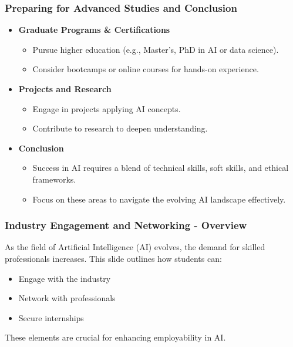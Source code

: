 \documentclass{beamer}
\begin{document}
\begin{frame}[fragile]
    \frametitle{Preparing for Advanced Studies and Conclusion}
    \begin{itemize}
        \item \textbf{Graduate Programs \& Certifications}
        \begin{itemize}
            \item Pursue higher education (e.g., Master's, PhD in AI or data science).
            \item Consider bootcamps or online courses for hands-on experience.
        \end{itemize}

        \item \textbf{Projects and Research}
        \begin{itemize}
            \item Engage in projects applying AI concepts.
            \item Contribute to research to deepen understanding.
        \end{itemize}

        \item \textbf{Conclusion}
        \begin{itemize}
            \item Success in AI requires a blend of technical skills, soft skills, and ethical frameworks.
            \item Focus on these areas to navigate the evolving AI landscape effectively.
        \end{itemize}
    \end{itemize}
\end{frame}

\begin{frame}[fragile]
    \frametitle{Industry Engagement and Networking - Overview}
    As the field of Artificial Intelligence (AI) evolves, the demand for skilled professionals increases. This slide outlines how students can:
    
    \begin{itemize}
        \item Engage with the industry
        \item Network with professionals
        \item Secure internships
    \end{itemize}
    
    These elements are crucial for enhancing employability in AI.
\end{frame}
\end{document}
